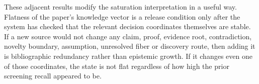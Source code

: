 These adjacent results modify the saturation interpretation in a useful way. Flatness of the paper's knowledge vector is a release condition only after the system has checked that the relevant decision coordinates themselves are stable. If a new source would not change any claim, proof, evidence root, contradiction, novelty boundary, assumption, unresolved fiber or discovery route, then adding it is bibliographic redundancy rather than epistemic growth. If it changes even one of those coordinates, the state is not flat regardless of how high the prior screening recall appeared to be.
